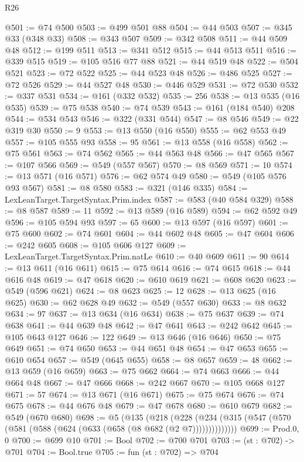 \begin{lexlean}{R26}
\begin{coremodule}
@501 := @74 @500
@503 := @499 @501 @88
@504 := @44 @503
@507 := @345 @33 (@348 @33)
@508 := @343 @507
@509 := @342 @508
@511 := @44 @509 @48
@512 := @199 @511
@513 := @341 @512
@515 := @44 @513 @511
@516 := @339 @515
@519 := @105 @516 @77 @88
@521 := @44 @519 @48
@522 := @504 @521
@523 := @72 @522
@525 := @44 @523 @48
@526 := @486 @525
@527 := @72 @526
@529 := @44 @527 @48
@530 := @446 @529
@531 := @72 @530
@532 := @337 @531
@534 := @161 (@332 @532)
@535 := 256
@538 := @13 @535 (@16 @535)
@539 := @75 @538
@540 := @74 @539
@543 := @161 (@184 @540) @208
@544 := @534 @543
@546 := @322 (@331 @544)
@547 := @8 @546
@549 := @22 @319 @30
@550 := 9
@553 := @13 @550 (@16 @550)
@555 := @62 @553 @49
@557 := @105 @555 @93
@558 := 95
@561 := @13 @558 (@16 @558)
@562 := @75 @561
@563 := @74 @562
@565 := @44 @563 @48
@566 := @47 @565
@567 := @107 @566
@569 := @549 (@557 @567)
@570 := @8 @569
@571 := 10
@574 := @13 @571 (@16 @571)
@576 := @62 @574 @49
@580 := @549 (@105 @576 @93 @567)
@581 := @8 @580
@583 := @321 (@146 @335)
@584 := LexLeanTarget.TargetSyntax.Prim.index
@587 := @583 (@40 @584 @329)
@588 := @8 @587
@589 := 11
@592 := @13 @589 (@16 @589)
@594 := @62 @592 @49
@596 := @105 @594 @93
@597 := 65
@600 := @13 @597 (@16 @597)
@601 := @75 @600
@602 := @74 @601
@604 := @44 @602 @48
@605 := @47 @604
@606 := @242 @605
@608 := @105 @606 @127
@609 := LexLeanTarget.TargetSyntax.Prim.natLe
@610 := @40 @609
@611 := 90
@614 := @13 @611 (@16 @611)
@615 := @75 @614
@616 := @74 @615
@618 := @44 @616 @48
@619 := @47 @618
@620 := @610 @619
@621 := @608 @620
@623 := @549 (@596 @621)
@624 := @8 @623
@625 := 12
@628 := @13 @625 (@16 @625)
@630 := @62 @628 @49
@632 := @549 (@557 @630)
@633 := @8 @632
@634 := 97
@637 := @13 @634 (@16 @634)
@638 := @75 @637
@639 := @74 @638
@641 := @44 @639 @48
@642 := @47 @641
@643 := @242 @642
@645 := @105 @643 @127
@646 := 122
@649 := @13 @646 (@16 @646)
@650 := @75 @649
@651 := @74 @650
@653 := @44 @651 @48
@654 := @47 @653
@655 := @610 @654
@657 := @549 (@645 @655)
@658 := @8 @657
@659 := 48
@662 := @13 @659 (@16 @659)
@663 := @75 @662
@664 := @74 @663
@666 := @44 @664 @48
@667 := @47 @666
@668 := @242 @667
@670 := @105 @668 @127
@671 := 57
@674 := @13 @671 (@16 @671)
@675 := @75 @674
@676 := @74 @675
@678 := @44 @676 @48
@679 := @47 @678
@680 := @610 @679
@682 := @549 (@670 @680)
@698 := @5
    (@135
      (@218
        (@228 (@234 (@315 (@547 (@570 (@581 (@588 (@624 (@633 (@658 (@8 @682 (@2 @7))))))))))))))
@699 := Prod.{0, 0}
@700 := @699 @10
@701 := Bool
@702 := @700 @701
@703 := (st : @702) -> @701
@704 := Bool.true
@705 := fun (st : @702) => @704

\end{coremodule}
\end{lexlean}
